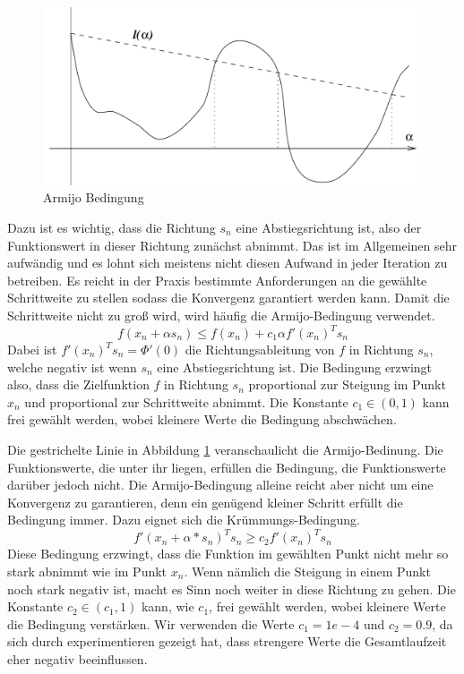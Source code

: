 \documentclass[runningheads,a4paper]{llncs}
\begin{document}
\begin{figure}[ht]
 \centering
 \includegraphics[scale=0.25]{armijo}
 \caption{Armijo Bedingung \cite{nocedal1999numerical}}
 \label{img:armijo}
\end{figure}

Dazu ist es wichtig, dass die Richtung $s_n$ eine Abstiegsrichtung ist, also der Funktionswert in dieser Richtung zunächst abnimmt. Das ist im Allgemeinen sehr aufwändig und es lohnt sich meistens nicht diesen Aufwand in jeder Iteration zu betreiben. Es reicht in der Praxis bestimmte Anforderungen an die gewählte Schrittweite zu stellen sodass die Konvergenz garantiert werden kann. Damit die Schrittweite nicht zu groß wird, wird häufig die Armijo-Bedingung verwendet.
\begin{equation}
\label{eq:armijo}
f(x_n+\alpha s_n) \le f(x_n)+c_1\alpha f'(x_n)^T s_n
\end{equation}
Dabei ist $f'(x_n)^T s_n = \Phi'(0)$ die Richtungsableitung von $f$ in Richtung $s_n$, welche negativ ist wenn $s_n$ eine Abstiegsrichtung ist. Die Bedingung erzwingt also, dass die Zielfunktion $f$ in Richtung $s_n$ proportional zur Steigung im Punkt $x_n$ und proportional zur Schrittweite abnimmt. Die Konstante $c_1 \in (0,1)$ kann frei gewählt werden, wobei kleinere Werte die Bedingung abschwächen.

Die gestrichelte Linie in Abbildung \ref{img:armijo} veranschaulicht die Armijo-Bedinung. Die Funktionswerte, die unter ihr liegen, erfüllen die Bedingung, die Funktionswerte darüber jedoch nicht. Die Armijo-Bedingung alleine reicht aber nicht um eine Konvergenz zu garantieren, denn ein genügend kleiner Schritt erfüllt die Bedingung immer. Dazu eignet sich die Krümmungs-Bedingung.
\begin{equation}
\label{eq:curvature}
f'(x_n+\alpha*s_n)^T s_n \ge c_2 f'(x_n)^T s_n
\end{equation}
Diese Bedingung erzwingt, dass die Funktion im gewählten Punkt nicht mehr so stark abnimmt wie im Punkt $x_n$. Wenn nämlich die Steigung in einem Punkt noch stark negativ ist, macht es Sinn noch weiter in diese Richtung zu gehen. Die Konstante ${c_2\in (c_1,1)}$ kann, wie $c_1$, frei gewählt werden, wobei kleinere Werte die Bedingung verstärken. Wir verwenden die Werte $c_1 = 1e-4$ und $c_2 = 0.9$, da sich durch experimentieren gezeigt hat, dass strengere Werte die Gesamtlaufzeit eher negativ beeinflussen.
\end{document}
